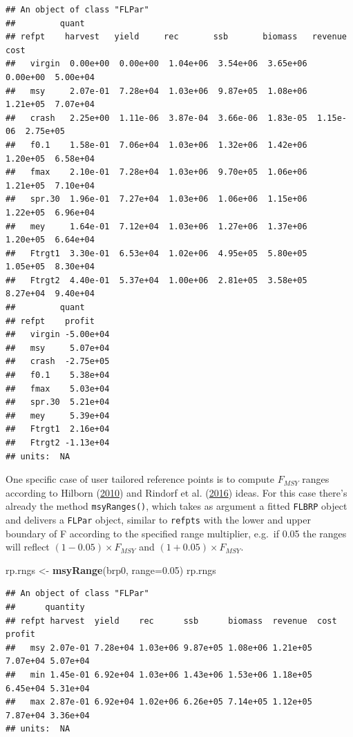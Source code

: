 \documentclass[
]{book}
\newenvironment{Shaded}{\begin{snugshade}}{\end{snugshade}}
\newcommand{\AttributeTok}[1]{\textcolor[rgb]{0.13,0.29,0.53}{#1}}
\newcommand{\FloatTok}[1]{\textcolor[rgb]{0.00,0.00,0.81}{#1}}
\newcommand{\FunctionTok}[1]{\textcolor[rgb]{0.13,0.29,0.53}{\textbf{#1}}}
\newcommand{\NormalTok}[1]{#1}
\newcommand{\OtherTok}[1]{\textcolor[rgb]{0.56,0.35,0.01}{#1}}
\begin{document}
\begin{verbatim}
## An object of class "FLPar"
##         quant
## refpt    harvest   yield     rec       ssb       biomass   revenue   cost     
##   virgin  0.00e+00  0.00e+00  1.04e+06  3.54e+06  3.65e+06  0.00e+00  5.00e+04
##   msy     2.07e-01  7.28e+04  1.03e+06  9.87e+05  1.08e+06  1.21e+05  7.07e+04
##   crash   2.25e+00  1.11e-06  3.87e-04  3.66e-06  1.83e-05  1.15e-06  2.75e+05
##   f0.1    1.58e-01  7.06e+04  1.03e+06  1.32e+06  1.42e+06  1.20e+05  6.58e+04
##   fmax    2.10e-01  7.28e+04  1.03e+06  9.70e+05  1.06e+06  1.21e+05  7.10e+04
##   spr.30  1.96e-01  7.27e+04  1.03e+06  1.06e+06  1.15e+06  1.22e+05  6.96e+04
##   mey     1.64e-01  7.12e+04  1.03e+06  1.27e+06  1.37e+06  1.20e+05  6.64e+04
##   Ftrgt1  3.30e-01  6.53e+04  1.02e+06  4.95e+05  5.80e+05  1.05e+05  8.30e+04
##   Ftrgt2  4.40e-01  5.37e+04  1.00e+06  2.81e+05  3.58e+05  8.27e+04  9.40e+04
##         quant
## refpt    profit   
##   virgin -5.00e+04
##   msy     5.07e+04
##   crash  -2.75e+05
##   f0.1    5.38e+04
##   fmax    5.03e+04
##   spr.30  5.21e+04
##   mey     5.39e+04
##   Ftrgt1  2.16e+04
##   Ftrgt2 -1.13e+04
## units:  NA
\end{verbatim}

One specific case of user tailored reference points is to compute \(F_{MSY}\) ranges according to Hilborn (\protect\hyperlink{ref-HILBORN2010193}{2010}) and Rindorf et al. (\protect\hyperlink{ref-Rindorf_etal_2016}{2016}) ideas. For this case there's already the method \texttt{msyRanges()}, which takes as argument a fitted \texttt{FLBRP} object and delivers a \texttt{FLPar} object, similar to \texttt{refpts} with the lower and upper boundary of F according to the specified range multiplier, e.g.~if 0.05 the ranges will reflect \((1-0.05) \times F_{MSY}\) and \((1+0.05) \times F_{MSY}\).

\begin{Shaded}
\begin{Highlighting}[]
\NormalTok{rp.rngs }\OtherTok{\textless{}{-}} \FunctionTok{msyRange}\NormalTok{(brp0, }\AttributeTok{range=}\FloatTok{0.05}\NormalTok{)}
\NormalTok{rp.rngs}
\end{Highlighting}
\end{Shaded}

\begin{verbatim}
## An object of class "FLPar"
##      quantity
## refpt harvest  yield    rec      ssb      biomass  revenue  cost     profit  
##   msy 2.07e-01 7.28e+04 1.03e+06 9.87e+05 1.08e+06 1.21e+05 7.07e+04 5.07e+04
##   min 1.45e-01 6.92e+04 1.03e+06 1.43e+06 1.53e+06 1.18e+05 6.45e+04 5.31e+04
##   max 2.87e-01 6.92e+04 1.02e+06 6.26e+05 7.14e+05 1.12e+05 7.87e+04 3.36e+04
## units:  NA
\end{verbatim}
\end{document}

